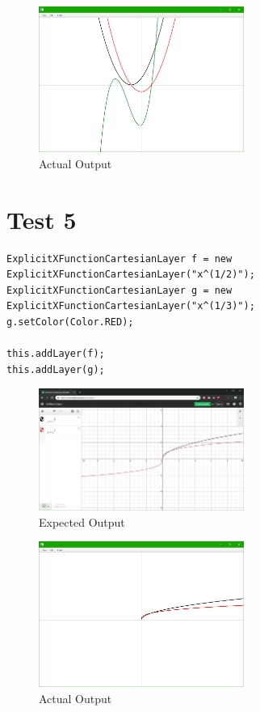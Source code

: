 \documentclass[../../../main.tex]{subfiles}
\begin{document}
\begin{figure}[H]
	\centering
	\includegraphics[width=0.6\textwidth]{tests/actual4}
	\caption{Actual Output}
\end{figure}
\newpage

\section{Test 5}
\begin{verbatim}
ExplicitXFunctionCartesianLayer f = new ExplicitXFunctionCartesianLayer("x^(1/2)");
ExplicitXFunctionCartesianLayer g = new ExplicitXFunctionCartesianLayer("x^(1/3)");
g.setColor(Color.RED);

this.addLayer(f);
this.addLayer(g);
\end{verbatim}

\begin{figure}[H]
	\centering
	\includegraphics[width=0.6\textwidth]{tests/expected5}
	\caption{Expected Output}
\end{figure}

\begin{figure}[H]
	\centering
	\includegraphics[width=0.6\textwidth]{tests/actual5}
	\caption{Actual Output}
\end{figure}
\newpage
\end{document}
